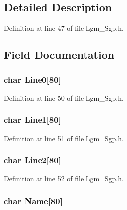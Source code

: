 \subsection{Detailed Description}


Definition at line 47 of file Lgm\_\-Sgp.h.

\subsection{Field Documentation}
\hypertarget{struct___sgp_t_l_e_e82736c1760be22e457d9d40dbeb39b6}{
\subsubsection[{Line0}]{\setlength{\rightskip}{0pt plus 5cm}char {\bf Line0}\mbox{[}80\mbox{]}}}
\label{struct___sgp_t_l_e_e82736c1760be22e457d9d40dbeb39b6}




Definition at line 50 of file Lgm\_\-Sgp.h.\hypertarget{struct___sgp_t_l_e_793987b1643141f9bec4786e272d1244}{
\subsubsection[{Line1}]{\setlength{\rightskip}{0pt plus 5cm}char {\bf Line1}\mbox{[}80\mbox{]}}}
\label{struct___sgp_t_l_e_793987b1643141f9bec4786e272d1244}




Definition at line 51 of file Lgm\_\-Sgp.h.\hypertarget{struct___sgp_t_l_e_05f315119f6d3da73fc77ce525f8d373}{
\subsubsection[{Line2}]{\setlength{\rightskip}{0pt plus 5cm}char {\bf Line2}\mbox{[}80\mbox{]}}}
\label{struct___sgp_t_l_e_05f315119f6d3da73fc77ce525f8d373}




Definition at line 52 of file Lgm\_\-Sgp.h.\hypertarget{struct___sgp_t_l_e_d1f4d8ec802a30593b1aadbaf41aa205}{
\subsubsection[{Name}]{\setlength{\rightskip}{0pt plus 5cm}char {\bf Name}\mbox{[}80\mbox{]}}}
\label{struct___sgp_t_l_e_d1f4d8ec802a30593b1aadbaf41aa205}




